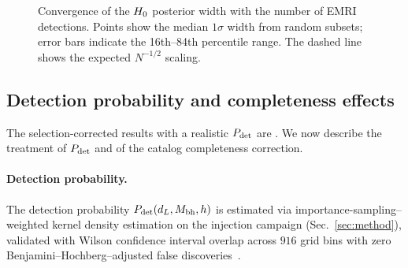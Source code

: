 \begin{figure}[t]
  \centering
  \caption{Convergence of the $H_0$ posterior width with the number of
  EMRI detections. Points show the median $1\sigma$ width from
   random subsets; error bars indicate the
  16th--84th percentile range. The dashed line shows the expected
  $N^{-1/2}$ scaling.}
  \label{fig:posterior_convergence}
\end{figure}

\subsection{Detection probability and completeness effects}
\label{sec:pdet_completeness}

The selection-corrected results with a realistic $P_\mathrm{det}$ are
. We now describe the treatment of $P_\mathrm{det}$ and of
the catalog completeness correction.

\paragraph{Detection probability.}
The detection probability $P_\mathrm{det}(d_L, M_\mathrm{bh}, h)$ is estimated via
importance-sampling--weighted kernel density estimation on the injection
campaign (Sec.~\ref{sec:method}), validated with Wilson confidence
interval overlap across $916$ grid bins with zero
Benjamini--Hochberg--adjusted false
discoveries~\cite{Farr:2019rap,Tiwari:2017ndi}.

